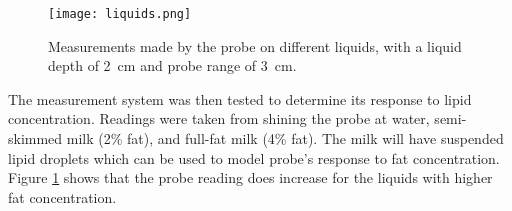 \begin{figure}[htb]
	\centering
	\texttt{[image: liquids.png]}
	\caption{Measurements made by the probe on different liquids, with a liquid depth of \SI{2}{\centi\metre} and probe range of \SI{3}{\centi\metre}.}
	\label{fig: liquids}
\end{figure}

The measurement system was then tested to determine its response to lipid concentration. Readings were taken from shining the probe at water, semi-skimmed milk (2\% fat), and full-fat milk (4\% fat). The milk will have suspended lipid droplets which can be used to model probe's response to fat concentration. Figure \ref{fig: liquids} shows that the probe reading does increase for the liquids with higher fat concentration.






